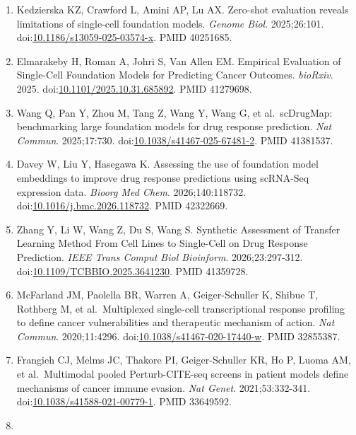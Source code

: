\documentclass{article}
\begin{document}
\begin{enumerate}
  In Silico Cellular Perturbation Prediction Models. \emph{bioRxiv}.
  2025.
  doi:\href{https://doi.org/10.1101/2025.03.06.641935}{10.1101/2025.03.06.641935}.
  PMID 40161693.
\item
  Kedzierska KZ, Crawford L, Amini AP, Lu AX. Zero-shot evaluation
  reveals limitations of single-cell foundation models. \emph{Genome
  Biol}. 2025;26:101.
  doi:\href{https://doi.org/10.1186/s13059-025-03574-x}{10.1186/s13059-025-03574-x}.
  PMID 40251685.
\item
  Elmarakeby H, Roman A, Johri S, Van Allen EM. Empirical Evaluation of
  Single-Cell Foundation Models for Predicting Cancer Outcomes.
  \emph{bioRxiv}. 2025.
  doi:\href{https://doi.org/10.1101/2025.10.31.685892}{10.1101/2025.10.31.685892}.
  PMID 41279698.
\item
  Wang Q, Pan Y, Zhou M, Tang Z, Wang Y, Wang G, et al.~scDrugMap:
  benchmarking large foundation models for drug response prediction.
  \emph{Nat Commun}. 2025;17:730.
  doi:\href{https://doi.org/10.1038/s41467-025-67481-2}{10.1038/s41467-025-67481-2}.
  PMID 41381537.
\item
  Davey W, Liu Y, Hasegawa K. Assessing the use of foundation model
  embeddings to improve drug response predictions using scRNA-Seq
  expression data. \emph{Bioorg Med Chem}. 2026;140:118732.
  doi:\href{https://doi.org/10.1016/j.bmc.2026.118732}{10.1016/j.bmc.2026.118732}.
  PMID 42322669.
\item
  Zhang Y, Li W, Wang Z, Du S, Wang S. Synthetic Assessment of Transfer
  Learning Method From Cell Lines to Single-Cell on Drug Response
  Prediction. \emph{IEEE Trans Comput Biol Bioinform}. 2026;23:297-312.
  doi:\href{https://doi.org/10.1109/TCBBIO.2025.3641230}{10.1109/TCBBIO.2025.3641230}.
  PMID 41359728.
\item
  McFarland JM, Paolella BR, Warren A, Geiger-Schuller K, Shibue T,
  Rothberg M, et al.~Multiplexed single-cell transcriptional response
  profiling to define cancer vulnerabilities and therapeutic mechanism
  of action. \emph{Nat Commun}. 2020;11:4296.
  doi:\href{https://doi.org/10.1038/s41467-020-17440-w}{10.1038/s41467-020-17440-w}.
  PMID 32855387.
\item
  Frangieh CJ, Melms JC, Thakore PI, Geiger-Schuller KR, Ho P, Luoma AM,
  et al.~Multimodal pooled Perturb-CITE-seq screens in patient models
  define mechanisms of cancer immune evasion. \emph{Nat Genet}.
  2021;53:332-341.
  doi:\href{https://doi.org/10.1038/s41588-021-00779-1}{10.1038/s41588-021-00779-1}.
  PMID 33649592.
\item

\end{enumerate}
\end{document}
